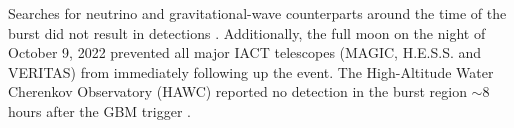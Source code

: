 \documentclass[preprint]{aastex631}
\begin{document}
Searches for neutrino and gravitational-wave counterparts around the time of the burst did not result in detections \citep{2022GCN.32741....1K, 2023ApJ...944..115A, 2023ApJ...946L..26A}. 
Additionally, the full moon on the night of October 9, 2022 prevented all major IACT telescopes (MAGIC, H.E.S.S. and VERITAS) from immediately following up the event.
The High-Altitude Water Cherenkov Observatory (HAWC) reported no detection in the burst region $\sim8$ hours after the GBM trigger \citep{2022GCN.32683....1A}. 
\end{document}
